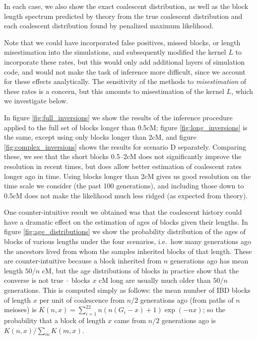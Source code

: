 \documentclass{article}
\begin{document}
In each case, we also show the exact coalescent distribution,
as well as the block length spectrum predicted by theory from 
the true coalescent distribution and each coalescent distribution found by penalized maximum likelihood.


Note that we could have incorporated false positives, missed blocks, or length misestimation into the simulations,
and subsequently modified the kernel $L$ to incorporate these rates,
but this would only add additional layers of simulation code, and would not make the task of inference more difficult,
since we account for these effects analytically.
The sensitivity of the methods to {\em misestimation} of these rates is a concern,
but this amounts to misestimation of the kernel $L$,
which we investigate below.

In figure \ref{fig:full_inversions} we show the results of the inference procedure applied to the full set of blocks longer than 0.5cM;
figure \ref{fig:long_inversions} is the same, except using only blocks longer than 2cM,
and figure \ref{fig:complex_inversions} shows the results for scenario D separately.
Comparing these, we see that the short blocks 0.5--2cM does not significantly improve the resolution in recent times,
but does allow better estimation of coalescent rates longer ago in time.
Using blocks longer than 2cM gives us good resolution on the time scale we consider (the past 100 generations),
and including those down to 0.5cM does not make the likelihood much less ridged (as expected from theory).

One counter-intuitive result we obtained was that the coalescent history could have a dramatic effect 
on the estimation of ages of blocks given their lengths.
In figure \ref{fig:age_distributions} we show the probability distribution of the ages of blocks of various lengths under the four scenarios,
i.e.\ how many generations ago the ancestors lived from whom the samples inherited blocks of that length.
These are counter-intuitive because a block inherited from $n$ generations ago has mean length $50/n$ cM,
but the age distributions of blocks in practice show that the converse is not true --
blocks $x$ cM long are usually much older than $50/n$ generations.
This is computed simply as follows:
the mean number of IBD blocks of length $x$ per unit of coalescence from $n/2$ generations ago (from paths of $n$ meioses)
is $K(n,x) = \sum_{i=1}^22 n(n(G_i-x)+1)\exp(-nx)$;
so the probability that a block of length $x$ came from $n/2$ generations ago is $K(n,x)/\sum_m K(m,x)$.
\end{document}
